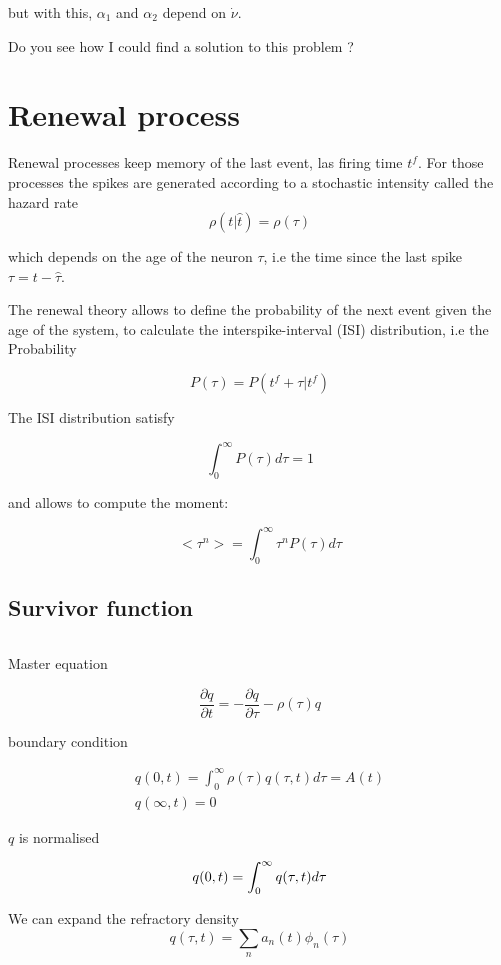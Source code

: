 \documentclass[a4paper,12pt,twoside]{article}
\def \be {\begin{equation}}
\def \ee {\end{equation}}
\begin{document}
but with this, $\alpha_1$  and $\alpha_2$ depend on $\dot{\nu}$.

Do you see how I could find a solution to this problem ? 


\newpage


\section{Renewal process}

Renewal processes keep memory of the last event, las firing time $t^f$. For those processes the spikes are generated according to a stochastic intensity called the hazard rate
\be
\rho(t|\hat{t})=\rho(\tau)
\ee

which depends on the age of the neuron $\tau$, i.e the time since the last spike $\tau=t-\hat{\tau}$.

The renewal theory allows to define the probability of the next event given the age of the system,  to calculate the interspike-interval (ISI) distribution, i.e the Probability 

\be 
P(\tau)=P(t^f+\tau| t^f)
\ee

The ISI distribution satisfy

\be 
\int_0^\infty P(\tau)d\tau=1 
\ee

and allows to compute the moment:


\be 
<\tau^n>=\int_0^\infty \tau^nP(\tau)d\tau
\ee



\subsection{Survivor function}

\be
\ee

Master equation

\be
\label{masterequation}
\frac{\partial q}{\partial t}=-\frac{\partial q}{\partial \tau}-\rho(\tau)q
\ee

boundary condition

\begin{align}
\label{boundarycondition}
q(0,t)=\int_{0}^{\infty}\rho(\tau)q(\tau,t)d\tau=A(t) \\
q(\infty,t)=0
\end{align}

$q$ is normalised 

\be
\label{nomalisation}
q(0,t)=\int_{0}^{\infty}q(\tau,t)d\tau \\
\ee


We can expand the refractory density
\be
\label{refractoryexpansion}
q(\tau,t)=\sum_n a_n(t)\phi_n(\tau)
\ee
\end{document}
